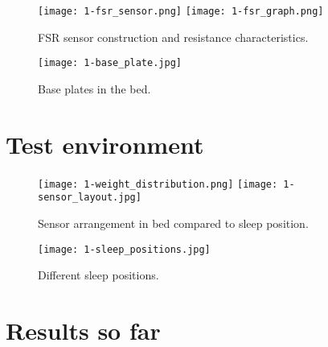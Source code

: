 \begin{figure}[h]
  \begin{center}
    \texttt{[image: 1-fsr\_sensor.png]}
    \texttt{[image: 1-fsr\_graph.png]}
  \end{center}
  \caption{FSR sensor construction and resistance characteristics.}
  \label{fig:fsr-sensor}
\end{figure}

\begin{figure}[h]
  \begin{center}
    \texttt{[image: 1-base\_plate.jpg]}
  \end{center}
  \caption{Base plates in the bed.}
  \label{fig:base-plate}
\end{figure}


\section{Test environment}

\begin{figure}[h]
  \begin{center}
    \texttt{[image: 1-weight\_distribution.png]}
    \texttt{[image: 1-sensor\_layout.jpg]}
  \end{center}
  \caption{Sensor arrangement in bed compared to sleep position.}
  \label{fig:sensor-layout}
\end{figure}

\begin{figure}[h]
  \begin{center}
    \texttt{[image: 1-sleep\_positions.jpg]}
  \end{center}
  \caption{Different sleep positions.}
  \label{fig:sleep_positions}
\end{figure}


\section{Results so far}


